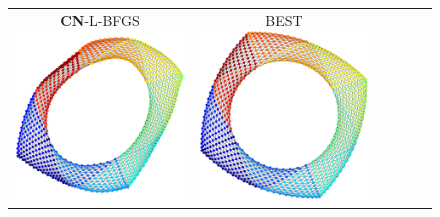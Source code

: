 \documentclass[dvipdfmx,10pt,journal,compsoc]{IEEEtran}
\begin{document}
\begin{figure}[btp]
\begin{tabular}{cccccc}
    \makecell{\small{\textsf{\textbf{CN}-L-BFGS}}                                                                                                        \\[-0.2em]\includegraphics[width=0.27\columnwidth]{individual/vis/jagmesh1_CN-L-BFGS.png}} &
    \makecell{\small{\textsf{BEST}}                                                                                                                      \\[-0.2em]\includegraphics[width=0.27\columnwidth]{individual/vis/opt_jagmesh1.png}} \\


\end{tabular}
\end{figure}
\end{document}
